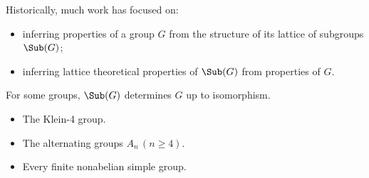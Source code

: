 \begin{frame}[fragile,label=Motivation1]{}
Historically, much work has focused on:
\vskip2mm
\begin{itemize}
\item inferring properties of a group $G$ from the
structure of its lattice of subgroups $\Sub(G)$;
\vskip4mm
\item inferring lattice theoretical properties of $\Sub(G)$ from properties of 
$G$. 
\end{itemize}

\end{frame}
\begin{frame}[fragile,label=MotivationPrezi]{}
For some groups, $\Sub(G)$ determines $G$ up to isomorphism.
\vskip4mm
\begin{Examples}
\begin{itemize}
\vskip2mm
\item[] The Klein-4 group.
\vskip5mm
\item[] The alternating groups $A_n\, (n\geq 4)$.
\vskip5mm
\item[] Every finite nonabelian simple group.
\vskip2mm
~
\end{itemize}
\end{Examples}
\end{frame}
\begin{frame}[fragile,label=MotivationPrezi]{}
        \begin{center}
    {
}
        \end{center}
\end{frame}

